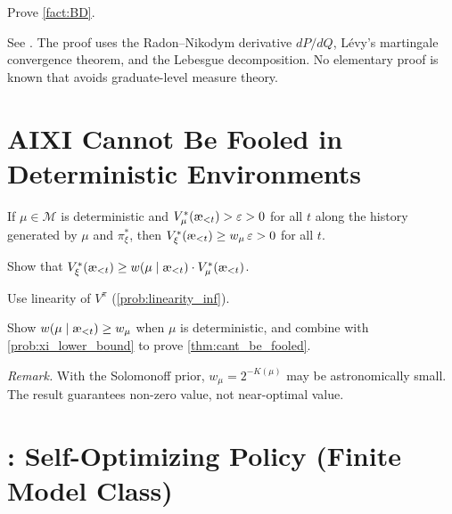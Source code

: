 \documentclass[fontsize=11pt, parskip=half]{scrartcl}
\newcommand{\cM}{\mathcal{M}}
\newcommand{\aes}{\textnormal{\ae}}
\begin{document}
\begin{exercise}
\label{prob:auto4}
\skippable
Prove \cref{fact:BD}.


\begin{hint}
See \cite{Blackwell:62}. The proof uses the Radon--Nikodym derivative $dP/dQ$, L\'{e}vy's martingale convergence theorem, and the Lebesgue decomposition.
No elementary proof is known that avoids graduate-level measure theory.
\end{hint}


\end{exercise}

\section{AIXI Cannot Be Fooled in Deterministic Environments}\label{prob:cant_be_fooled}

\begin{theorem}\label{thm:cant_be_fooled}
If $\mu \in \cM$ is deterministic and $V_\mu^*(\aes_{<t}) > \varepsilon > 0$ for all $t$ along the history generated by $\mu$ and $\pi_\xi^*$, then $V_\xi^*(\aes_{<t}) \geq w_\mu\, \varepsilon > 0$ for all $t$. \cite[Theorem 7.4.10]{Hutter:24uaibook2}
\end{theorem}

\begin{exercise}
\label{prob:xi_lower_bound}
Show that $V_\xi^*(\aes_{<t}) \geq w(\mu \mid \aes_{<t}) \cdot V_\mu^*(\aes_{<t})$.


\begin{hint}
Use linearity of $V^\pi$ (\cref{prob:linearity_inf}).
\end{hint}
\end{exercise}


\begin{exercise}
\label{prob:auto5}
Show $w(\mu \mid \aes_{<t}) \geq w_\mu$ when $\mu$ is deterministic, and combine with \cref{prob:xi_lower_bound} to prove \cref{thm:cant_be_fooled}.

\end{exercise}


\textit{Remark.} With the Solomonoff prior, $w_\mu = 2^{-K(\mu)}$ may be astronomically small. The result guarantees non-zero value, not near-optimal value.


\section*{: Self-Optimizing Policy (Finite Model Class)}
\end{document}
